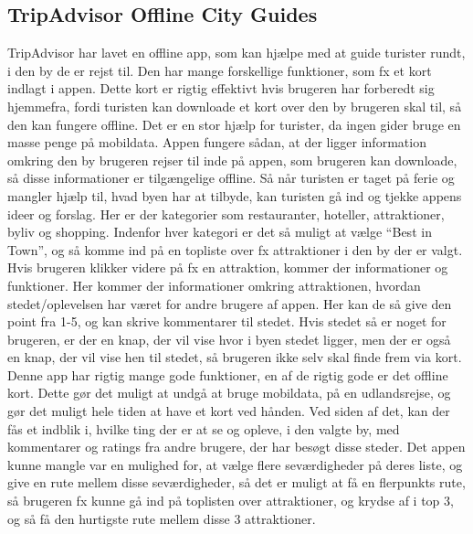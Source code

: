 \subsection{TripAdvisor Offline City Guides}
TripAdvisor har lavet en offline app, som kan hjælpe med at guide turister rundt, i den by de er rejst til. Den har mange forskellige funktioner, som fx et kort indlagt i appen. Dette kort er rigtig effektivt hvis brugeren har forberedt sig hjemmefra, fordi turisten kan downloade et kort over den by brugeren skal til, så den kan fungere offline. Det er en stor hjælp for turister, da ingen gider bruge en masse penge på mobildata. \newline
Appen fungere sådan, at der ligger information omkring den by brugeren rejser til inde på appen, som brugeren kan downloade, så disse informationer er tilgængelige offline. Så når turisten er taget på ferie og mangler hjælp til, hvad byen har at tilbyde, kan turisten gå ind og tjekke appens ideer og forslag. Her er der kategorier som restauranter, hoteller, attraktioner, byliv og shopping. Indenfor hver kategori er det så muligt at vælge “Best in Town”, og så komme ind på en topliste over fx attraktioner i den by der er valgt.\newline
Hvis brugeren klikker videre på fx en attraktion, kommer der informationer og funktioner. Her kommer der informationer omkring attraktionen, hvordan stedet/oplevelsen har været for andre brugere af appen. Her kan de så give den point fra 1-5, og kan skrive kommentarer til stedet. Hvis stedet så er noget for brugeren, er der en knap, der vil vise hvor i byen stedet ligger, men der er også en knap, der vil vise hen til stedet, så brugeren ikke selv skal finde frem via kort.
Denne app har rigtig mange gode funktioner, en af de rigtig gode er det offline kort. Dette gør det muligt at undgå at bruge mobildata, på en udlandsrejse, og gør det muligt hele tiden at have et kort ved hånden. Ved siden af det, kan der fås et indblik i, hvilke ting der er at se og opleve, i den valgte by, med kommentarer og ratings fra andre brugere, der har besøgt disse steder.
Det appen kunne mangle var en mulighed for, at vælge flere seværdigheder på deres liste, og give en rute mellem disse seværdigheder, så det er muligt at få en flerpunkts rute, så brugeren fx kunne gå ind på toplisten over attraktioner, og krydse af i top 3, og så få den hurtigste rute mellem disse 3 attraktioner. 

